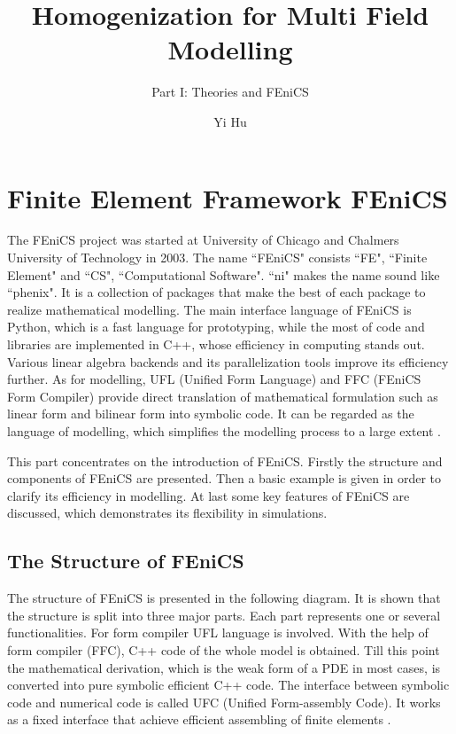 \documentclass[10pt,a4paper]{scrreprt}
\author{Yi Hu}
\title{Homogenization for Multi Field Modelling}
\subtitle{Part I: Theories and FEniCS}
\begin{document}
\chapter{Finite Element Framework FEniCS}

The FEniCS project was started at University of Chicago and Chalmers University of Technology in 2003. The name ``FEniCS" consists ``FE", ``Finite Element" and ``CS", ``Computational Software". ``ni" makes the name sound like ``phenix". It is a collection of packages that make the best of each package to realize mathematical modelling. The main interface language of FEniCS is Python, which is a fast language for prototyping, while the most of code and libraries are implemented in C++, whose efficiency in computing stands out. Various linear algebra backends and its parallelization tools improve its efficiency further. As for modelling, UFL (Unified Form Language) and FFC (FEniCS Form Compiler) provide direct translation of mathematical formulation such as linear form and bilinear form into symbolic code. It can be regarded as the language of modelling, which simplifies the modelling process to a large extent \citep{kirby2006compiler}.

This part concentrates on the introduction of FEniCS. Firstly the structure and components of FEniCS are presented. Then a basic example is given in order to clarify its efficiency in modelling. At last some key features of FEniCS are discussed, which demonstrates its flexibility in simulations.

\section{The Structure of FEniCS}
The structure of FEniCS is presented in the following diagram. It is shown that the structure is split into three major parts. Each part represents one or several functionalities. For form compiler UFL language is involved. With the help of form compiler (FFC), C++ code of the whole model is obtained. Till this point the mathematical derivation, which is the weak form of a PDE in most cases, is converted into pure symbolic efficient C++ code. The interface between symbolic code and numerical code is called UFC (Unified Form-assembly Code). It works as a fixed interface that achieve efficient assembling of finite elements \citep{wells2012automated}.
\end{document}
